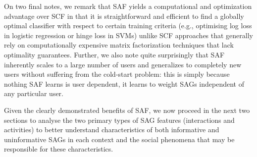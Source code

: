 On two final notes, we remark that SAF yields a computational and
optimization advantage over SCF in that it is straightforward and
efficient to find a globally optimal classifier with respect to certain training
criteria (e.g., optimising log loss in logistic regression or hinge
loss in SVMs) unlike SCF approaches that generally rely on
computationally expensive matrix factorization techniques that lack
optimality guarantees.  Further, we also note quite surprisingly that
SAF inherently scales to a large number of users and generalizes to
completely new users without suffering from the cold-start problem:
this is simply because nothing SAF learns is user dependent, it learns
to weight SAGs independent of any particular user.

Given the clearly demonstrated benefits of SAF, we now proceed in the
next two sections to analyse the two primary types of SAG features
(interactions and activities) to better understand characteristics of
both informative and uninformative SAGs in each context and the social
phenomena that may be responsible for these characteristics.
